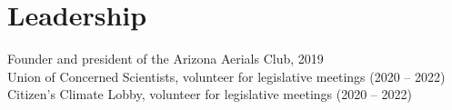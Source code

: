 \section{\mysidestyle Leadership}
Founder and president of the Arizona Aerials Club, 2019\\
Union of Concerned Scientists, volunteer for legislative meetings (2020 – 2022)\\
Citizen’s Climate Lobby, volunteer for legislative meetings (2020 – 2022)\\